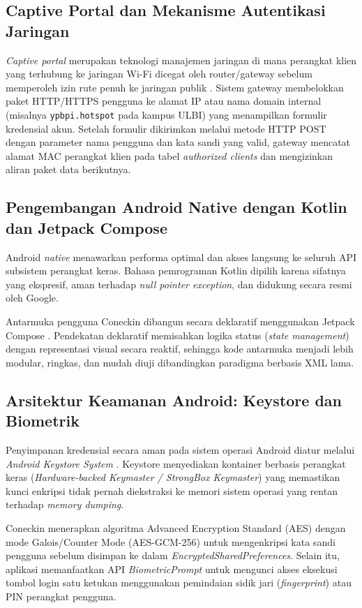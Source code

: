 \subsection{Captive Portal dan Mekanisme Autentikasi Jaringan}
\textit{Captive portal} merupakan teknologi manajemen jaringan di mana perangkat klien yang terhubung ke jaringan Wi-Fi dicegat oleh router/gateway sebelum memperoleh izin rute penuh ke jaringan publik \cite{captive_portal_survey}. Sistem gateway membelokkan paket HTTP/HTTPS pengguna ke alamat IP atau nama domain internal (misalnya \texttt{ypbpi.hotspot} pada kampus ULBI) yang menampilkan formulir kredensial akun. Setelah formulir dikirimkan melalui metode HTTP POST dengan parameter nama pengguna dan kata sandi yang valid, gateway mencatat alamat MAC perangkat klien pada tabel \textit{authorized clients} dan mengizinkan aliran paket data berikutnya.

\subsection{Pengembangan Android Native dengan Kotlin dan Jetpack Compose}
Android \textit{native} menawarkan performa optimal dan akses langsung ke seluruh API subsistem perangkat keras. Bahasa pemrograman Kotlin dipilih karena sifatnya yang ekspresif, aman terhadap \textit{null pointer exception}, dan didukung secara resmi oleh Google. 

Antarmuka pengguna Coneckin dibangun secara deklaratif menggunakan Jetpack Compose \cite{jetpack_compose_study}. Pendekatan deklaratif memisahkan logika status (\textit{state management}) dengan representasi visual secara reaktif, sehingga kode antarmuka menjadi lebih modular, ringkas, dan mudah diuji dibandingkan paradigma berbasis XML lama.

\subsection{Arsitektur Keamanan Android: Keystore dan Biometrik}
Penyimpanan kredensial secara aman pada sistem operasi Android diatur melalui \textit{Android Keystore System} \cite{android_security_internals, google_android_docs}. Keystore menyediakan kontainer berbasis perangkat keras (\textit{Hardware-backed Keymaster / StrongBox Keymaster}) yang memastikan kunci enkripsi tidak pernah diekstraksi ke memori sistem operasi yang rentan terhadap \textit{memory dumping}.

Coneckin menerapkan algoritma Advanced Encryption Standard (AES) dengan mode Galois/Counter Mode (AES-GCM-256) untuk mengenkripsi kata sandi pengguna sebelum disimpan ke dalam \textit{EncryptedSharedPreferences}. Selain itu, aplikasi memanfaatkan API \textit{BiometricPrompt} untuk mengunci akses eksekusi tombol login satu ketukan menggunakan pemindaian sidik jari (\textit{fingerprint}) atau PIN perangkat pengguna.

